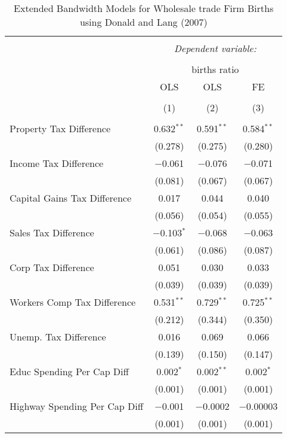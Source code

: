 
\begin{table}[!htbp] \centering 
  \caption{Extended Bandwidth Models for  Wholesale trade Firm Births using Donald and Lang (2007)} 
  \label{} 
\begin{tabular}{@{\extracolsep{5pt}}lccc} 
\\[-1.8ex]\hline 
\hline \\[-1.8ex] 
 & \multicolumn{3}{c}{\textit{Dependent variable:}} \\ 
\cline{2-4} 
\\[-1.8ex] & \multicolumn{3}{c}{births ratio} \\ 
 & OLS & OLS & FE \\ 
\\[-1.8ex] & (1) & (2) & (3)\\ 
\hline \\[-1.8ex] 
 Property Tax Difference & 0.632$^{**}$ & 0.591$^{**}$ & 0.584$^{**}$ \\ 
  & (0.278) & (0.275) & (0.280) \\ 
  Income Tax Difference & $-$0.061 & $-$0.076 & $-$0.071 \\ 
  & (0.081) & (0.067) & (0.067) \\ 
  Capital Gains Tax Difference & 0.017 & 0.044 & 0.040 \\ 
  & (0.056) & (0.054) & (0.055) \\ 
  Sales Tax Difference & $-$0.103$^{*}$ & $-$0.068 & $-$0.063 \\ 
  & (0.061) & (0.086) & (0.087) \\ 
  Corp Tax Difference & 0.051 & 0.030 & 0.033 \\ 
  & (0.039) & (0.039) & (0.039) \\ 
  Workers Comp Tax Difference & 0.531$^{**}$ & 0.729$^{**}$ & 0.725$^{**}$ \\ 
  & (0.212) & (0.344) & (0.350) \\ 
  Unemp. Tax Difference & 0.016 & 0.069 & 0.066 \\ 
  & (0.139) & (0.150) & (0.147) \\ 
  Educ Spending Per Cap Diff & 0.002$^{*}$ & 0.002$^{**}$ & 0.002$^{*}$ \\ 
  & (0.001) & (0.001) & (0.001) \\ 
  Highway Spending Per Cap Diff & $-$0.001 & $-$0.0002 & $-$0.00003 \\ 
  & (0.001) & (0.001) & (0.001) \\ 

\end{tabular}
\end{table}
